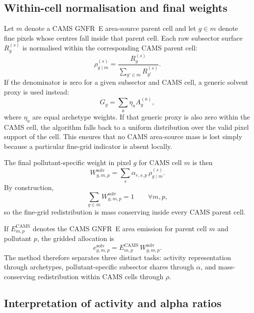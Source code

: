 \subsection{Within-cell normalisation and final weights}

Let $m$ denote a CAMS GNFR~E area-source parent cell and let
$g \in m$ denote fine pixels whose centres fall inside that parent cell.
Each raw subsector surface $R_g^{(s)}$ is normalised within the
corresponding CAMS parent cell:
\begin{equation}
  \rho_{g \mid m}^{(s)} =
  \frac{R_g^{(s)}}
       {\displaystyle\sum_{g' \in m} R_{g'}^{(s)}}.
\end{equation}
If the denominator is zero for a given subsector and CAMS cell, a
generic solvent proxy is used instead:
\begin{equation}
  G_g = \sum_a \eta_a A_g^{(a)},
\end{equation}
where $\eta_a$ are equal archetype weights. If that generic proxy is
also zero within the CAMS cell, the algorithm falls back to a uniform
distribution over the valid pixel support of the cell. This ensures that
no CAMS area-source mass is lost simply because a particular fine-grid
indicator is absent locally.

The final pollutant-specific weight in pixel $g$ for CAMS cell $m$ is
then
\begin{equation}
  W_{g,m,p}^{\mathrm{solv}} =
  \sum_s \alpha_{r,s,p} \, \rho_{g \mid m}^{(s)}.
\end{equation}
By construction,
\begin{equation}
  \sum_{g \in m} W_{g,m,p}^{\mathrm{solv}} = 1
  \qquad \forall m,p,
\end{equation}
so the fine-grid redistribution is mass conserving inside every CAMS
parent cell.

If $E_{m,p}^{\mathrm{CAMS}}$ denotes the CAMS GNFR~E area emission for
parent cell $m$ and pollutant $p$, the gridded allocation is
\begin{equation}
  e_{g,m,p}^{\mathrm{solv}} =
  E_{m,p}^{\mathrm{CAMS}} \,
  W_{g,m,p}^{\mathrm{solv}}.
\end{equation}
The method therefore separates three distinct tasks: activity
representation through archetypes, pollutant-specific subsector shares
through $\alpha$, and mass-conserving redistribution within CAMS cells
through $\rho$.

\subsection{Interpretation of activity and alpha ratios}

